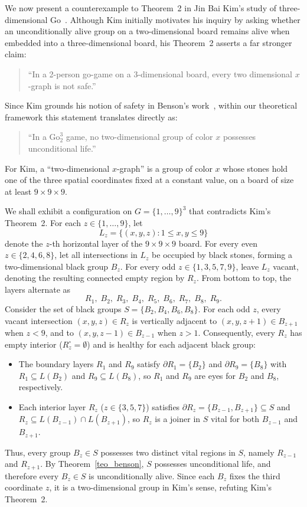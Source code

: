 We now present a counterexample to Theorem~2 in Jin Bai Kim's study of three-dimensional Go~\cite{KJB1}. Although Kim initially motivates his inquiry by asking whether an unconditionally alive group on a two-dimensional board remains alive when embedded into a three-dimensional board, his Theorem~2 asserts a far stronger claim:
\begin{quote}
	``In a 2-person go-game on a 3-dimensional board, every two dimensional $x$-graph is not safe.''
\end{quote}
Since Kim grounds his notion of safety in Benson's work~\cite{Benson}, within our theoretical framework this statement translates directly as:
\begin{quote}
	``In a $\mathrm{Go}_2^3$ game, no two-dimensional group of color $x$ possesses unconditional life.''
\end{quote}
For Kim, a ``two-dimensional $x$-graph'' is a group of color $x$ whose stones hold one of the three spatial coordinates fixed at a constant value, on a board of size at least $9 \times 9 \times 9$.

We shall exhibit a configuration on $G = \{1, \dots, 9\}^3$ that contradicts Kim's Theorem~2. For each $z \in \{1, \dots, 9\}$, let
\[
L_z = \{(x, y, z) : 1 \le x, y \le 9\}
\]
denote the $z$-th horizontal layer of the $9 \times 9 \times 9$ board. For every even $z \in \{2, 4, 6, 8\}$, let all intersections in $L_z$ be occupied by black stones, forming a two-dimensional black group $B_z$. For every odd $z \in \{1, 3, 5, 7, 9\}$, leave $L_z$ vacant, denoting the resulting connected empty region by $R_z$. From bottom to top, the layers alternate as
\[
R_1, \; B_2, \; R_3, \; B_4, \; R_5, \; B_6, \; R_7, \; B_8, \; R_9.
\]
Consider the set of black groups $S = \{B_2, B_4, B_6, B_8\}$. For each odd $z$, every vacant intersection $(x, y, z) \in R_z$ is vertically adjacent to $(x, y, z+1) \in B_{z+1}$ when $z < 9$, and to $(x, y, z-1) \in B_{z-1}$ when $z > 1$. Consequently, every $R_z$ has empty interior ($R_z^\circ = \emptyset$) and is healthy for each adjacent black group:
\begin{itemize}
	\item The boundary layers $R_1$ and $R_9$ satisfy $\partial R_1 = \{B_2\}$ and $\partial R_9 = \{B_8\}$ with $R_1 \subseteq L(B_2)$ and $R_9 \subseteq L(B_8)$, so $R_1$ and $R_9$ are eyes for $B_2$ and $B_8$, respectively.
	\item Each interior layer $R_z$ ($z \in \{3, 5, 7\}$) satisfies $\partial R_z = \{B_{z-1}, B_{z+1}\} \subseteq S$ and $R_z \subseteq L(B_{z-1}) \cap L(B_{z+1})$, so $R_z$ is a joiner in $S$ vital for both $B_{z-1}$ and $B_{z+1}$.
\end{itemize}
Thus, every group $B_z \in S$ possesses two distinct vital regions in $S$, namely $R_{z-1}$ and $R_{z+1}$. By Theorem~\ref{teo_benson}, $S$ possesses unconditional life, and therefore every $B_z \in S$ is unconditionally alive. Since each $B_z$ fixes the third coordinate $z$, it is a two-dimensional group in Kim's sense, refuting Kim's Theorem~2.

